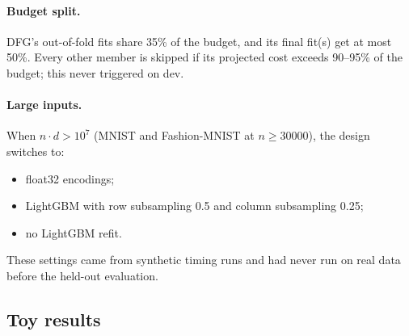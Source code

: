 \paragraph{Budget split.} DFG's out-of-fold fits share 35\% of the budget, and its final fit(s) get at most 50\%. Every other member is skipped if its projected cost exceeds 90--95\% of the budget; this never triggered on dev.

\paragraph{Large inputs.} When $n\cdot d>10^7$ (MNIST and Fashion-MNIST at $n\ge30000$), the design switches to:
\begin{itemize}
\item float32 encodings;
\item LightGBM with row subsampling 0.5 and column subsampling 0.25;
\item no LightGBM refit.
\end{itemize}
These settings came from synthetic timing runs and had never run on real data before the held-out evaluation.

\subsection{Toy results}\label{sec:toyresults}

\begin{table}[t]
\centering
{\footnotesize\setlength{\tabcolsep}{4pt}}
\caption{The fresh toy suite : $\nstar$ per target, inputs permuted per fit . Definitions are in \cref{sec:toysetup}. ``portfolio'' is ; ``DFG alone'' and ``without DFG'' are the post-hoc ablations of \cref{sec:attribution}. The last column is computed from unrounded values. Generated by \texttt{make\_tables.py} from ; the values agree with .}
\label{tab:dlheld3}
\end{table}

\begin{table}[t]
\centering\footnotesize\setlength{\tabcolsep}{3pt}

\caption{ (inputs permuted) on all five toy suites: mean $\log_2\nstar$ ratio against each network reference, with the number of targets clearly better / clearly worse in brackets . The last column shows logistic regression alone against ; its ``worse'' counts include every target it never learns. Outside ,  equals .}
\label{tab:toysuites}
\end{table}

